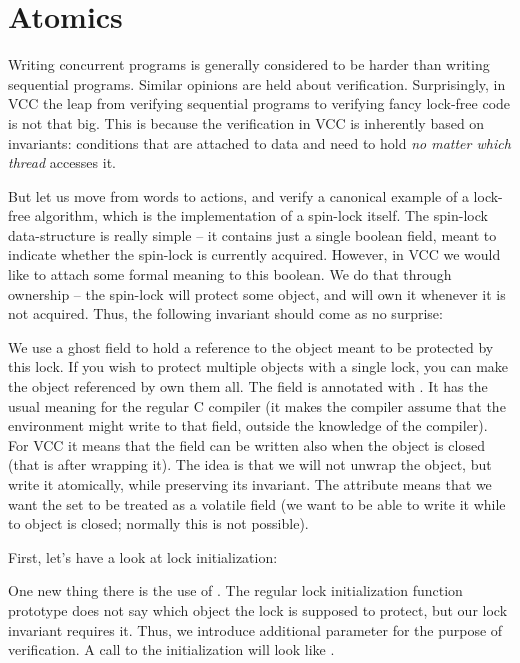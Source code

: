 \section{Atomics}
\label{sect:concurrency}

Writing concurrent programs is generally considered to be harder than writing
sequential programs.
Similar opinions are held about verification.
Surprisingly, in VCC the leap from verifying sequential programs to
verifying fancy lock-free code is not that big.
This is because the verification in VCC is inherently based on invariants:
conditions that are attached to data and need to hold \emph{no matter which thread}
accesses it.

But let us move from words to actions, and verify a canonical example
of a lock-free algorithm, which is the implementation of a spin-lock itself.
The spin-lock data-structure is really simple -- it contains just a single
boolean field, meant to indicate whether the spin-lock
is currently acquired.
However, in VCC we would like to attach some formal meaning to this boolean.
We do that through ownership -- the spin-lock will protect some object,
and will own it whenever it is not acquired.
Thus, the following invariant should come as no surprise:


\noindent
We use a ghost field to hold a reference to the object meant to be protected
by this lock.
If you wish to protect multiple objects with a single lock, you can make
the object referenced by  own them all.
The  field is annotated with .
It has the usual meaning for the regular C compiler (\ie it makes the compiler
assume that the environment might write to that field, outside the knowledge
of the compiler).
For VCC it means that the field can be written also when the object is
closed (that is after wrapping it).
The idea is that we will not unwrap the object, but write it atomically,
while preserving its invariant.
The attribute
 means that we want the \vcc{\owns} set
to be treated as a volatile field (\ie we want to be able to write
it while to object is closed; normally this is not possible).

First, let's have a look at lock initialization:


\noindent
One new thing there is the use of .
The regular lock initialization function prototype does not say which
object the lock is supposed to protect, but our lock invariant requires it.
Thus, we introduce additional parameter for the purpose of verification.
A call to the initialization will look like .

